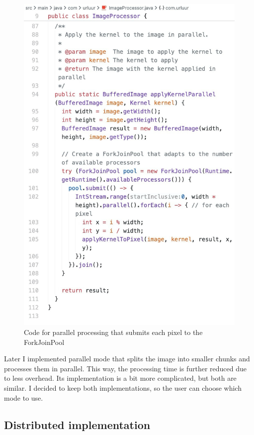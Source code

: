\documentclass{article}
\begin{document}
\begin{multicols}{2}
    \begin{figure}[H]
        \centering
        \includegraphics[width=\linewidth]{img/parallel.jpg}
        \caption{Code for parallel processing that submits each pixel to the ForkJoinPool}
        \label{fig:Parallel Code}
    \end{figure}

    Later I implemented parallel mode that splits the image into smaller chunks and processes them in parallel. This way, the processing time is further reduced due to less overhead. Its implementation is a bit more complicated, but both are similar. I decided to keep both implementations, so the user can choose which mode to use.

    \subsection{Distributed implementation}


\end{multicols}
\end{document}
